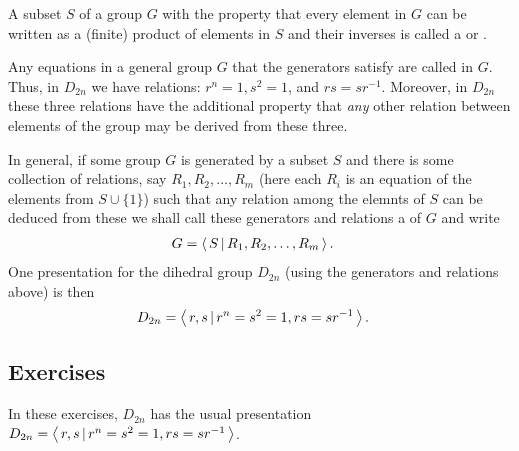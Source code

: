 \documentclass[10pt,a4paper]{report}
\begin{document}
\begin{definition}[Generators]A subset $S$ of a group $G$ with the property that every element in $G$ can be written as a (finite) product of elements in $S$ and their inverses is called a  or .
\end{definition}

\begin{definition}[Relations] Any equations in a general group $G$ that the generators satisfy are called  in $G$.  Thus, in $D_{2n}$ we have relations: $r^n=1,s^2=1$, and $rs=sr^{-1}$.  Moreover, in $D_{2n}$ these three relations have the additional property that \textit{any} other relation between elements of the group may be derived from these three.
\end{definition}

\begin{definition}[Presentation]In general, if some group $G$ is generated by a subset $S$ and there is some collection of relations, say $R_1, R_2, \dots, R_m$ (here each $R_i$ is an equation of the elements from $S \cup \{1\}$) such that any relation among the elemnts of $S$ can be deduced from these we shall call these generators and relations a  of $G$ and write
\begin{align*}
	G &= \left \langle\, S\,|\,R_1, R_2, \dots,R_m \,\right \rangle.
\end{align*}One presentation for the dihedral group $D_{2n}$ (using the generators and relations above) is then
\begin{align*}
	D_{2n} &= \left \langle\, r,s\,|\,r^n=s^2=1,rs=sr^{-1} \,\right \rangle.
\end{align*}
\end{definition}

\subsection{Exercises}

In these exercises, $D_{2n}$ has the usual presentation $D_{2n} = \left \langle\, r,s\,|\,r^n=s^2=1,rs=sr^{-1} \,\right \rangle$.
\end{document}
